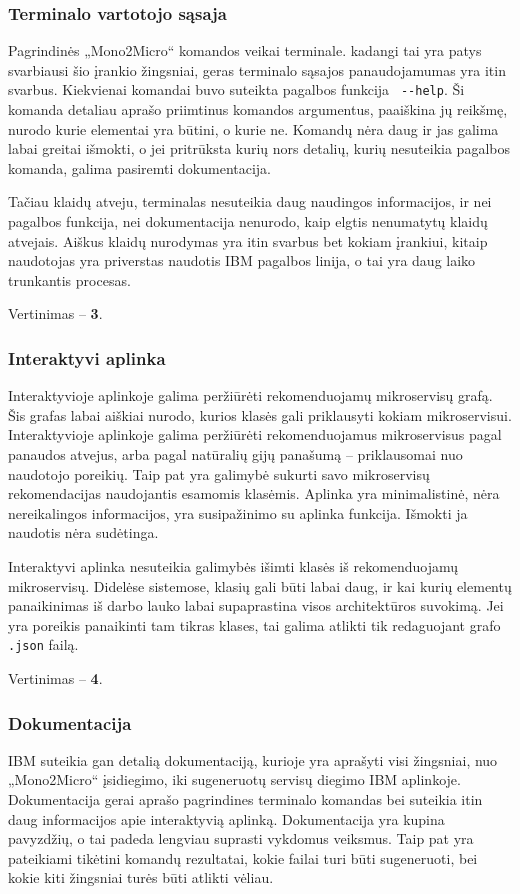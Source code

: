 \documentclass{VUMIFPSbakalaurinis}
\begin{document}
\subsubsection{Terminalo vartotojo sąsaja}
Pagrindinės „Mono2Micro“ komandos veikai terminale. kadangi tai yra patys svarbiausi šio įrankio žingsniai, geras terminalo sąsajos panaudojamumas yra itin svarbus. Kiekvienai komandai buvo suteikta pagalbos funkcija \verb| --help|. Ši komanda detaliau aprašo priimtinus komandos argumentus, paaiškina jų reikšmę, nurodo kurie elementai yra būtini, o kurie ne. Komandų nėra daug ir jas galima labai greitai išmokti, o jei pritrūksta kurių nors detalių, kurių nesuteikia pagalbos komanda, galima pasiremti dokumentacija.

Tačiau klaidų atveju, terminalas nesuteikia daug naudingos informacijos, ir nei pagalbos funkcija, nei dokumentacija nenurodo, kaip elgtis nenumatytų klaidų atvejais. Aiškus klaidų nurodymas yra itin svarbus bet kokiam įrankiui, kitaip naudotojas yra priverstas naudotis IBM pagalbos linija, o tai yra daug laiko trunkantis procesas.

Vertinimas -- \textbf{3}.

\subsubsection{Interaktyvi aplinka}
Interaktyvioje aplinkoje galima peržiūrėti rekomenduojamų mikroservisų grafą. Šis grafas labai aiškiai nurodo, kurios klasės gali priklausyti kokiam mikroservisui. Interaktyvioje aplinkoje galima peržiūrėti rekomenduojamus mikroservisus pagal panaudos atvejus, arba pagal natūralių gijų panašumą -- priklausomai nuo naudotojo poreikių. Taip pat yra galimybė sukurti savo mikroservisų rekomendacijas naudojantis esamomis klasėmis. Aplinka yra minimalistinė, nėra nereikalingos informacijos, yra susipažinimo su aplinka funkcija. Išmokti ja naudotis nėra sudėtinga.

Interaktyvi aplinka nesuteikia galimybės išimti klasės iš rekomenduojamų mikroservisų. Didelėse sistemose, klasių gali būti labai daug, ir kai kurių elementų panaikinimas iš darbo lauko labai supaprastina visos architektūros suvokimą. Jei yra poreikis panaikinti tam tikras klases, tai galima atlikti tik redaguojant grafo \verb|.json| failą.

Vertinimas -- \textbf{4}.

\subsubsection{Dokumentacija}
IBM suteikia gan detalią dokumentaciją, kurioje yra aprašyti visi žingsniai, nuo „Mono2Micro“ įsidiegimo, iki sugeneruotų servisų diegimo IBM aplinkoje. Dokumentacija gerai aprašo pagrindines terminalo komandas bei suteikia itin daug informacijos apie interaktyvią aplinką. Dokumentacija yra kupina pavyzdžių, o tai padeda lengviau suprasti vykdomus veiksmus. Taip pat yra pateikiami tikėtini komandų rezultatai, kokie failai turi būti sugeneruoti, bei kokie kiti žingsniai turės būti atlikti vėliau.
\end{document}
